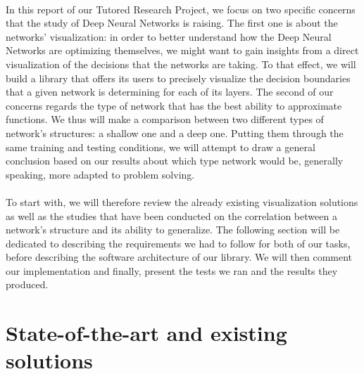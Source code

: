 \documentclass[a4paper]{article}
\begin{document}
\paragraph{}In this report of our Tutored Research Project, we focus on two specific concerns that the study of Deep Neural Networks is raising. The first one is about the networks' visualization: in order to better understand how the Deep Neural Networks are optimizing themselves, we might want to gain insights from a direct visualization of the decisions that the networks are taking. To that effect, we will build a library that offers its users to precisely visualize the decision boundaries that a given network is determining for each of its layers. The second of our concerns regards the type of network that has the best ability to approximate functions. We thus will make a comparison between two different types of network's structures: a shallow one and a deep one. Putting them through the same training and testing conditions, we will attempt to draw a general conclusion based on our results about which type network would be, generally speaking, more adapted to problem solving. 

\paragraph{}To start with, we will therefore review the already existing visualization solutions as well as the studies that have been conducted on the correlation between a network's structure and its ability to generalize. The following section will be dedicated to describing the requirements we had to follow for both of our tasks, before describing the software architecture of our library. We will then comment our implementation and finally, present the tests we ran and the results they produced.




\section{State-of-the-art and existing solutions}

\end{document}
